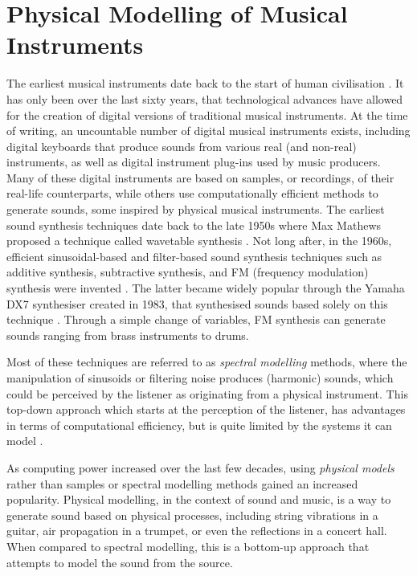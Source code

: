 \chapter{Physical Modelling of Musical Instruments}\label{ch:physMod}
The earliest musical instruments date back to the start of human civilisation \cite{Fletcher1998}. It has only been over the last sixty years, that technological advances have allowed for the creation of digital versions of traditional musical instruments. At the time of writing, an uncountable number of digital musical instruments exists, including digital keyboards that produce sounds from various real (and non-real) instruments, as well as digital instrument plug-ins used by music producers. Many of these digital instruments are based on samples, or recordings, of their real-life counterparts, while others use computationally efficient methods to generate sounds, some inspired by physical musical instruments. The earliest sound synthesis techniques date back to the late 1950s where Max Mathews proposed a technique called wavetable synthesis \cite{Puckette2002}. Not long after, in the 1960s, efficient sinusoidal-based and filter-based sound synthesis techniques such as additive synthesis, subtractive synthesis, and FM (frequency modulation) synthesis were invented \cite{Roads1996, Chowning1973}. The latter became widely popular through the Yamaha DX7 synthesiser created in 1983, that synthesised sounds based solely on this technique \cite{DX7}. Through a simple change of variables, FM synthesis can generate sounds ranging from brass instruments to drums. 

Most of these techniques are referred to as \textit{spectral modelling} methods, where the manipulation of sinusoids or filtering noise produces (harmonic) sounds, which could be perceived by the listener as originating from a physical instrument. This top-down approach which starts at the perception of the listener, has advantages in terms of computational efficiency, but is quite limited by the systems it can model \cite{Smith2010a}. 

As computing power increased over the last few decades, using \textit{physical models} rather than samples or spectral modelling methods gained an increased popularity.
Physical modelling, in the context of sound and music, is a way to generate sound based on physical processes, including string vibrations in a guitar, air propagation in a trumpet, or even the reflections in a concert hall. When compared to spectral modelling, this is a bottom-up approach that attempts to model the sound from the source.  

